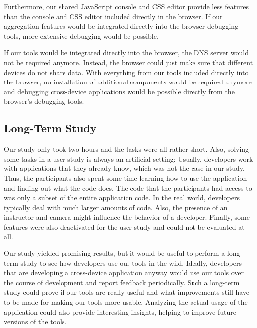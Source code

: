 Furthermore, our shared JavaScript console and CSS editor provide less features than the console and CSS editor included directly in the browser. If our aggregation features would be integrated directly into the browser debugging tools, more extensive debugging would be possible.

If our tools would be integrated directly into the browser, the DNS server would not be required anymore. Instead, the browser could just make sure that different devices do not share data. With everything from our tools included directly into the browser, no installation of additional components would be required anymore and debugging cross-device applications would be possible directly from the browser's debugging tools.

\subsection{Long-Term Study}

Our study only took two hours and the tasks were all rather short. Also, solving some tasks in a user study is always an artificial setting: Usually, developers work with applications that they already know, which was not the case in our study. Thus, the participants also spent some time learning how to use the application and finding out what the code does. The code that the participants had access to was only a subset of the entire application code. In the real world, developers typically deal with much larger amounts of code. Also, the presence of an instructor and camera might influence the behavior of a developer. Finally, some features were also deactivated for the user study and could not be evaluated at all.

Our study yielded promising results, but it would be useful to perform a long-term study to see how developers use our tools in the wild. Ideally, developers that are developing a cross-device application anyway would use our tools over the course of development and report feedback periodically. Such a long-term study could prove if our tools are really useful and what improvements still have to be made for making our tools more usable. Analyzing the actual usage of the application could also provide interesting insights, helping to improve future versions of the tools.